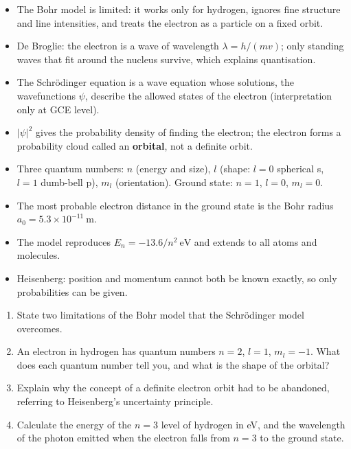 \documentclass[11pt]{article}
\begin{document}
\begin{aretenir}
\begin{itemize}
\item The Bohr model is limited: it works only for hydrogen, ignores fine structure and line intensities, and treats the electron as a particle on a fixed orbit.
\item De Broglie: the electron is a wave of wavelength $\lambda = h/(mv)$; only standing waves that fit around the nucleus survive, which explains quantisation.
\item The Schrödinger equation is a wave equation whose solutions, the wavefunctions $\psi$, describe the allowed states of the electron (interpretation only at GCE level).
\item $|\psi|^2$ gives the probability density of finding the electron; the electron forms a probability cloud called an \textbf{orbital}, not a definite orbit.
\item Three quantum numbers: $n$ (energy and size), $l$ (shape: $l=0$ spherical s, $l=1$ dumb-bell p), $m_l$ (orientation). Ground state: $n=1$, $l=0$, $m_l=0$.
\item The most probable electron distance in the ground state is the Bohr radius $a_0 = 5.3\times 10^{-11}\ \mathrm{m}$.
\item The model reproduces $E_n = -13.6/n^2\ \mathrm{eV}$ and extends to all atoms and molecules.
\item Heisenberg: position and momentum cannot both be known exactly, so only probabilities can be given.
\end{itemize}
\end{aretenir}

\begin{exercice}
\begin{enumerate}
\item State two limitations of the Bohr model that the Schrödinger model overcomes.
\item An electron in hydrogen has quantum numbers $n = 2$, $l = 1$, $m_l = -1$. What does each quantum number tell you, and what is the shape of the orbital?
\item Explain why the concept of a definite electron orbit had to be abandoned, referring to Heisenberg's uncertainty principle.
\item Calculate the energy of the $n = 3$ level of hydrogen in eV, and the wavelength of the photon emitted when the electron falls from $n = 3$ to the ground state.
\end{enumerate}
\end{exercice}
\end{document}
